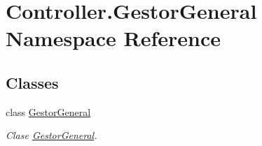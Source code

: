 \hypertarget{namespace_controller_1_1_gestor_general}{}\section{Controller.\+Gestor\+General Namespace Reference}
\label{namespace_controller_1_1_gestor_general}
\subsection*{Classes}
\begin{DoxyCompactItemize}
\item 
class \hyperlink{class_controller_1_1_gestor_general_1_1_gestor_general}{Gestor\+General}
\begin{DoxyCompactList}\small\item\em Clase \hyperlink{class_controller_1_1_gestor_general_1_1_gestor_general}{Gestor\+General}. \end{DoxyCompactList}\end{DoxyCompactItemize}
